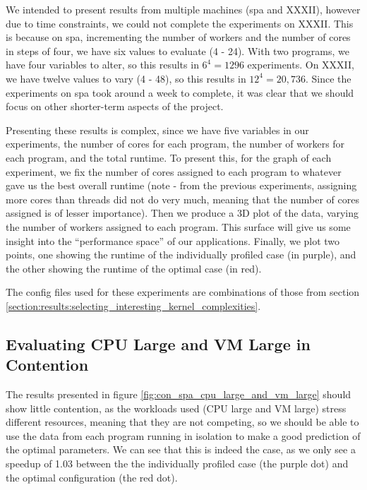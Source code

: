 We intended to present results from multiple machines (spa and XXXII), however due to time constraints, we could not complete the experiments on XXXII. This is because on spa, incrementing the number of workers and the number of cores in steps of four, we have six values to evaluate (4 - 24). With two programs, we have four variables to alter, so this results in $6^4 = 1296$ experiments. On XXXII, we have twelve values to vary (4 - 48), so this results in $12^4 = 20,736$. Since the experiments on spa took around a week to complete, it was clear that we should focus on other shorter-term aspects of the project.

Presenting these results is complex, since we have five variables in our experiments, the number of cores for each program, the number of workers for each program, and the total runtime. To present this, for the graph of each experiment, we fix the number of cores assigned to each program to whatever gave us the best overall runtime (note - from the previous experiments, assigning more cores than threads did not do very much, meaning that the number of cores assigned is of lesser importance). Then we produce a 3D plot of the data, varying the number of workers assigned to each program. This surface will give us some insight into the ``performance space'' of our applications. Finally, we plot two points, one showing the runtime of the individually profiled case (in purple), and the other showing the runtime of the optimal case (in red). 

The config files used for these experiments are combinations of those from section \ref{section:results:selecting_interesting_kernel_complexities}.



\subsection{Evaluating CPU Large and VM Large in Contention}
\label{section:results:evaluating_cpu_large_and_vm_large_in_contention}

The results presented in figure \ref{fig:con_spa_cpu_large_and_vm_large} should show little contention, as the workloads used (CPU large and VM large) stress different resources, meaning that they are not competing, so we should be able to use the data from each program running in isolation to make a good prediction of the optimal parameters. We can see that this is indeed the case, as we only see a speedup of 1.03 between the the individually profiled case (the purple dot) and the optimal configuration (the red dot).

